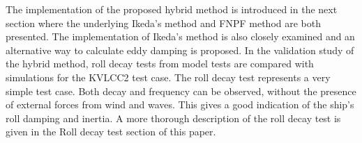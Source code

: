 The implementation of the proposed hybrid method is introduced in the
next section where the underlying Ikeda's method and FNPF method are
both presented. The implementation of Ikeda's method is also closely
examined and an alternative way to calculate eddy damping is proposed.
In the validation study of the hybrid method, roll decay tests from
model tests are compared with simulations for the KVLCC2 test case. The
roll decay test represents a very simple test case. Both decay and
frequency can be observed, without the presence of external forces from
wind and waves. This gives a good indication of the ship's roll damping
and inertia. A more thorough description of the roll decay test is given
in the Roll decay test section of this paper.

    